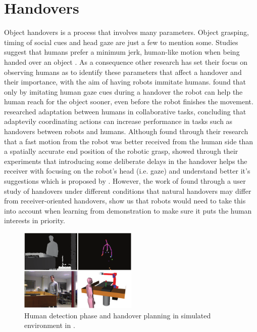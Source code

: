 \section{Handovers}
Object handovers is a process that involves many parameters. Object grasping, timing of social cues and head gaze are just a few to mention some. Studies suggest that humans prefer a minimum jerk, human-like motion when being handed over an object \parencite{Huber2008} \parencite{Huber2008a}. As a consequence other research has set their focus on observing humans as to identify these parameters that affect a handover and their importance, with the aim of having robots immitate humans. \textcite{Moon2014} found that only by imitating human gaze cues during a handover the robot can help the human reach for the object sooner, even before the robot finishes the movement. \textcite{Huang2015} researched adaptation between humans in collaborative tasks, concluding that adaptevily coordinating actions can increase performance in tasks such as handovers between robots and humans. Although \textcite{Koene2014} found through their research that a fast motion from the robot was better received from the human side than a spatially accurate end position of the robotic grasp, \textcite{Admoni2014} showed through their experiments that introducing some deliberate delays in the handover helps the receiver with focusing on the robot's head (i.e. gaze) and understand better it's suggestions which is proposed by \parencite{Moon2014}. However, the work of \textcite{Chan2015} found through a user study of handovers under different conditions that natural handovers may differ from receiver-oriented handovers, show us that robots would need to take this into account when learning from demonstration to make sure it puts the human interests in priority.

\begin{figure}
	\centering
	\includegraphics[width=0.5\textwidth]{img/related-work/planning-simulation.png}
	\caption{Human detection phase and handover planning in simulated environment in \parencite{Aleotti2012}.}
\end{figure}

